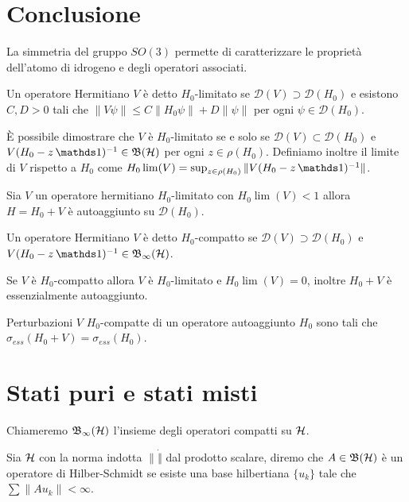 \section*{Conclusione}
La simmetria del gruppo $SO(3)$ permette di caratterizzare le proprietà dell'atomo di idrogeno e degli operatori associati.


\begin{definition}
    Un operatore Hermitiano $V$ è detto $H_0$-limitato se $\mathcal{D}(V) \supset \mathcal{D}(H_0)$ e esistono $C,D> 0$ tali che $\| V \psi \| \leq C \| H_0 \psi \| + D \| \psi \|$ per ogni $\psi \in \mathcal{D}(H_0)$. 
\end{definition}

È possibile dimostrare che $V$ è $H_0$-limitato se e solo se $\mathcal{D}(V) \subset \mathcal{D}(H_0)$ e $V(H_0 -z \un)^{-1}\in \B$ per ogni $z \in \rho(H_0)$. Definiamo inoltre il limite di $V$ rispetto a $H_0$ come $H_0\lim(V) = \sup_{z \in \rho(H_0)} \| V(H_0 -z \un)^{-1}\|$.

\begin{theorem}
    Sia $V$ un operatore hermitiano $H_0$-limitato con $H_0\lim(V)< 1$ allora $H = H_0 + V$ è autoaggiunto su $\mathcal{D}(H_0)$.
\end{theorem}

\begin{definition}
    Un operatore Hermitiano $V$ è detto $H_0$-compatto se $\mathcal{D}(V) \supset \mathcal{D}(H_0)$ e $V(H_0 -z \un)^{-1}\in \Bo$.
\end{definition}

Se $V$ è $H_0$-compatto allora $V$ è $H_0$-limitato e $H_0\lim(V) = 0$, inoltre $H_0 + V$ è essenzialmente autoaggiunto.

\begin{theorem}[Weyl]
    Perturbazioni $V$ $H_0$-compatte di un operatore autoaggiunto $H_0$ sono tali che $\sigma_{ess}(H_0 + V) = \sigma_{ess}(H_0)$.
\end{theorem}

\section{Stati puri e stati misti}
Chiameremo $\operatorname{\mathfrak{B}_\infty(\mathcal{H})}$ l'insieme degli operatori compatti su $\operatorname{\mathcal{H}}$.

\begin{definition}
    Sia $\operatorname{\mathcal{H}}$ con la norma indotta $\| \dot \|$ dal prodotto scalare, diremo che $A \in \operatorname{\mathfrak{B}(\mathcal{H})}$ è un operatore di Hilber-Schmidt se esiste una base hilbertiana $\{ u_k\}$ tale che $\sum \|Au_k \|<\infty$. 
\end{definition}

